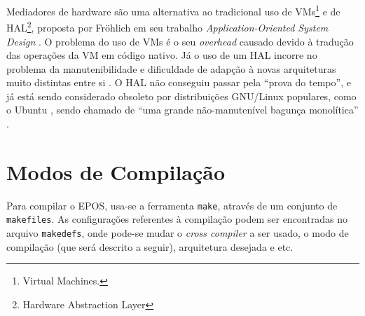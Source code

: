 Mediadores de hardware são uma alternativa ao tradicional uso de VMs\footnote{Virtual Machines.} e de HAL\footnote{Hardware Abstraction Layer}, proposta por Fröhlich em seu trabalho \emph{Application-Oriented System Design} \cite{guto_thesis}. O problema do uso de VMs é o seu \emph{overhead} causado devido à tradução das operações da VM em código nativo. Já o uso de um HAL incorre no problema da manutenibilidade e dificuldade de adapção à novas arquiteturas muito distintas entre si \cite{hw_mediators}. O HAL não conseguiu passar pela ``prova do tempo'', e já está sendo considerado obsoleto por distribuições GNU/Linux populares, como o 
Ubuntu \cite{linux_magazine}, sendo chamado de ``uma grande não-manutenível bagunça monolítica'' \cite{halsectomy}.







\section{Modos de Compilação}

Para compilar o EPOS, usa-se a ferramenta \verb+make+, através de um conjunto de \verb+makefiles+. As configurações referentes à compilação podem ser encontradas no arquivo \verb+makedefs+, onde pode-se mudar o \emph{cross compiler} a ser usado, o modo de compilação (que será descrito a seguir), arquitetura desejada e etc.


